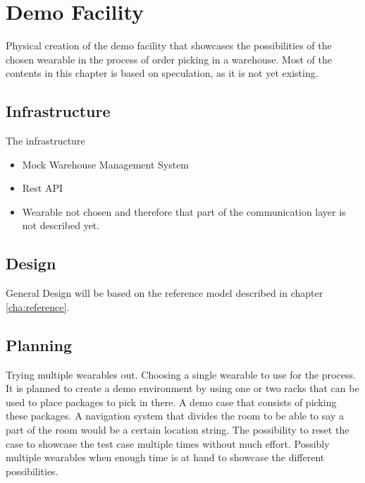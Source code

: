 \chapter{Demo Facility}\label{cha:demoFacility}
Physical creation of the demo facility that showcases the possibilities of the chosen wearable in the process of order picking in a warehouse. Most of the contents in this chapter is based on speculation, as it is not yet existing.

\section{Infrastructure}
The infrastructure
\begin{itemize}
	\item Mock Warehouse Management System
	\item Rest API
	\item Wearable not chosen and therefore that part of the communication layer is not described yet.
\end{itemize}
\section{Design}
General Design will be based on the reference model described in chapter \ref{cha:reference}. 
\section{Planning}
Trying multiple wearables out. Choosing a single wearable to use for the process. It is planned to create a demo environment by using one or two racks that can be used to place packages to pick in there. A demo case that consists of picking these packages. A navigation system that divides the room to be able to say a part of the room would be a certain location string. The possibility to reset the case to showcase the test case multiple times without much effort. Possibly multiple wearables when enough time is at hand to showcase the different possibilities.